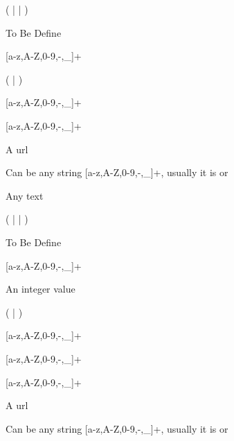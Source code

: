 (  |  | )

\noindent
{}

To Be Define

\noindent
{}

[a-z,A-Z,0-9,-,\_]+

\noindent
{}

(  |  )

\noindent
{}

[a-z,A-Z,0-9,-,\_]+

\noindent
{}

[a-z,A-Z,0-9,-,\_]+

\noindent
{}

A url

\noindent
{}

Can be any string [a-z,A-Z,0-9,-,\_]+, usually it is  or 

\noindent
{}

Any text


\noindent
{}

(  |  | )

\noindent
{}

To Be Define

\noindent
{}

[a-z,A-Z,0-9,-,\_]+

\noindent
{}

An integer value

\noindent
{}

(  |  )

\noindent
{}

[a-z,A-Z,0-9,-,\_]+

\noindent
{}

[a-z,A-Z,0-9,-,\_]+

\noindent
{}

[a-z,A-Z,0-9,-,\_]+

\noindent
{}

A url

\noindent
{}

Can be any string [a-z,A-Z,0-9,-,\_]+, usually it is  or 

